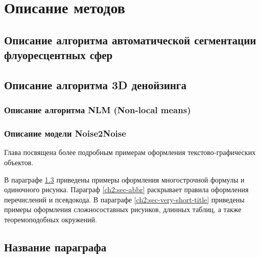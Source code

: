 \chapter{Описание методов} \label{ch2}

\section{Описание алгоритма автоматической сегментации флуоресцентных сфер}
\section{Описание алгоритма 3D денойзинга}
\subsection{Описание алгоритма NLM (Non-local means)}	
\subsection{Описание модели Noise2Noise}

Глава посвящена более подробным примерам оформления текстово-графических объектов.

В параграфе \ref{ch2:title-abbr} приведены примеры оформления многострочной формулы и одиночного рисунка. Параграф \ref{ch2:sec-abbr} раскрывает правила оформления перечислений и псевдокода. В параграфе \ref{ch2:sec-very-short-title} приведены примеры оформления сложносоставных рисунков, длинных таблиц, а также теоремоподобных окружений.


\section{Название параграфа} \label{ch2:title-abbr} %





